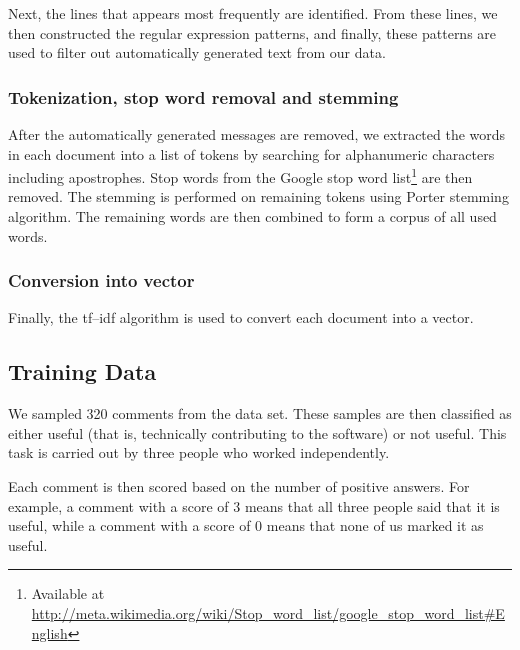 \documentclass[conference]{IEEEtran}
\begin{document}
Next, the lines that appears most frequently are identified.
From these lines, we then constructed the regular expression patterns,
and finally, these patterns are used to filter out automatically generated text from our data.

\subsubsection{Tokenization, stop word removal and stemming}

After the automatically generated messages are removed, we extracted the words in each document into a list of tokens by searching for alphanumeric characters including apostrophes.
Stop words from the Google stop word list\footnote{Available at \url{http://meta.wikimedia.org/wiki/Stop_word_list/google_stop_word_list#English}} are then removed.
The stemming is performed on remaining tokens using Porter stemming algorithm.
The remaining words are then combined to form a corpus of all used words.

\subsubsection{Conversion into vector}

Finally, the tf--idf algorithm is used to convert each document into a vector.


\subsection{Training Data}

We sampled 320 comments from the data set.
These samples are then classified as either useful (that is, technically contributing to the software) or not useful.
This task is carried out by three people who worked independently.

Each comment is then scored based on the number of positive answers.
For example, a comment with a score of 3 means that all three people said that it is useful,
while a comment with a score of 0 means that none of us marked it as useful.


\end{document}
